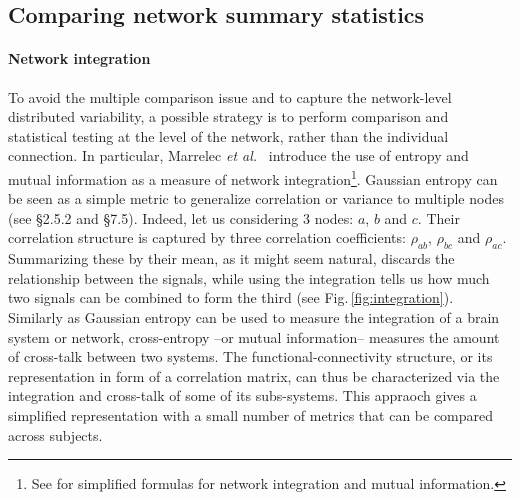 \documentclass[5p]{elsarticle}
\begin{document}

\subsection{Comparing network summary statistics}

\paragraph{Network integration}
%
To avoid the multiple comparison issue and to capture the network-level
distributed variability, a possible strategy is to perform comparison and
statistical testing at the level of the network, rather than the
individual connection. In particular, Marrelec \emph{et al.}\
\cite{marrelec2008} introduce the use of entropy and mutual information
as a measure of network integration\footnote{See \cite{varoquaux2010c}
for simplified formulas for network integration and mutual information.}.
Gaussian entropy can be seen as a simple metric to generalize correlation
or variance to multiple nodes (see \cite{anderson1958} \S2.5.2 and
\S7.5). Indeed, let us considering 3 nodes: $a$, $b$ and $c$. Their
correlation structure is captured by three correlation coefficients:
$\rho_{ab}$, $\rho_{bc}$ and $\rho_{ac}$. Summarizing these by their
mean, as it might seem natural, discards the relationship between the
signals, while using the integration tells us how much two signals can be
combined to form the third (see Fig.\,\ref{fig:integration}). Similarly
as Gaussian entropy can be used to measure the integration of a brain
system or network, cross-entropy --or mutual information--
\cite{marrelec2008} measures the amount of cross-talk between two
systems. The functional-connectivity structure, or its representation in
form of a correlation matrix, can thus be characterized via the
integration and cross-talk of some of its subs-systems. This appraoch
gives a simplified representation with a small number of metrics that can
be compared across subjects.
\end{document}
